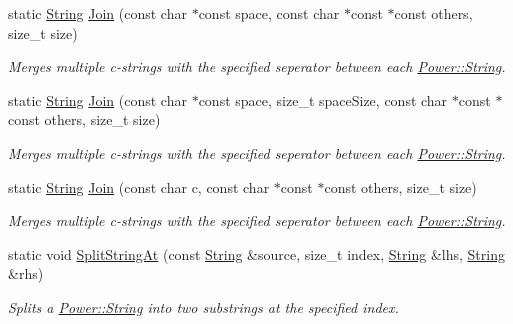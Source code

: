 \begin{DoxyCompactItemize}
static \hyperlink{class_power_1_1_string}{String} \hyperlink{class_power_1_1_string_a1fbd780649df6b1acebccfe1c9a6e82f}{Join} (const char $\ast$const space, const char $\ast$const $\ast$const others, size\+\_\+t size)
\begin{DoxyCompactList}\small\item\em Merges multiple c-\/strings with the specified seperator between each \hyperlink{class_power_1_1_string}{Power\+::\+String}. \end{DoxyCompactList}\item 
static \hyperlink{class_power_1_1_string}{String} \hyperlink{class_power_1_1_string_aba57935ddeb06365e785d570099c1250}{Join} (const char $\ast$const space, size\+\_\+t space\+Size, const char $\ast$const $\ast$const others, size\+\_\+t size)
\begin{DoxyCompactList}\small\item\em Merges multiple c-\/strings with the specified seperator between each \hyperlink{class_power_1_1_string}{Power\+::\+String}. \end{DoxyCompactList}\item 
static \hyperlink{class_power_1_1_string}{String} \hyperlink{class_power_1_1_string_ad1a312071c2e9f15b6ca614d13ac8ef8}{Join} (const char c, const char $\ast$const $\ast$const others, size\+\_\+t size)
\begin{DoxyCompactList}\small\item\em Merges multiple c-\/strings with the specified seperator between each \hyperlink{class_power_1_1_string}{Power\+::\+String}. \end{DoxyCompactList}\item 
static void \hyperlink{class_power_1_1_string_a706749eb38e54ab15410821f1713b5c7}{Split\+String\+At} (const \hyperlink{class_power_1_1_string}{String} \&source, size\+\_\+t index, \hyperlink{class_power_1_1_string}{String} \&lhs, \hyperlink{class_power_1_1_string}{String} \&rhs)
\begin{DoxyCompactList}\small\item\em Splits a \hyperlink{class_power_1_1_string}{Power\+::\+String} into two substrings at the specified index. \end{DoxyCompactList}\end{DoxyCompactItemize}
